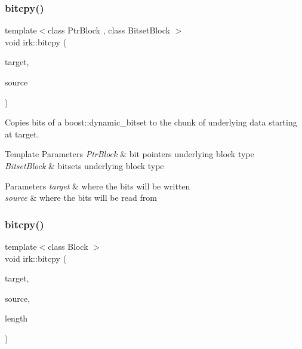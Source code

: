 \subsubsection{\texorpdfstring{bitcpy()}{bitcpy()}\hspace{0.1cm}{\footnotesize\ttfamily [1/2]}}
{\footnotesize\ttfamily template$<$class Ptr\+Block , class Bitset\+Block $>$ \\
void irk\+::bitcpy (\begin{DoxyParamCaption}\item[{\mbox{\hyperlink{classirk_1_1bitptr}{bitptr}}$<$ Ptr\+Block $>$}]{target,  }\item[{const boost\+::dynamic\+\_\+bitset$<$ Bitset\+Block $>$ \&}]{source }\end{DoxyParamCaption})}

Copies bits of a {\ttfamily boost\+::dynamic\+\_\+bitset} to the chunk of underlying data starting at {\ttfamily target}. ~\newline



\begin{DoxyTemplParams}{Template Parameters}
{\em Ptr\+Block} & bit pointer\textquotesingle{}s underlying block type \\
\hline
{\em Bitset\+Block} & bitset\textquotesingle{}s underlying block type\\
\hline
\end{DoxyTemplParams}

\begin{DoxyParams}{Parameters}
{\em target} & where the bits will be written \\
\hline
{\em source} & where the bits will be read from \\
\hline
\end{DoxyParams}
\mbox{\label{namespaceirk_a339a0543200e91f59773f625063c959c}} 
\subsubsection{\texorpdfstring{bitcpy()}{bitcpy()}\hspace{0.1cm}{\footnotesize\ttfamily [2/2]}}
{\footnotesize\ttfamily template$<$class Block $>$ \\
void irk\+::bitcpy (\begin{DoxyParamCaption}\item[{\mbox{\hyperlink{classirk_1_1bitptr}{bitptr}}$<$ Block $>$}]{target,  }\item[{\mbox{\hyperlink{classirk_1_1bitptr}{bitptr}}$<$ Block $>$}]{source,  }\item[{std\+::size\+\_\+t}]{length }\end{DoxyParamCaption})}



